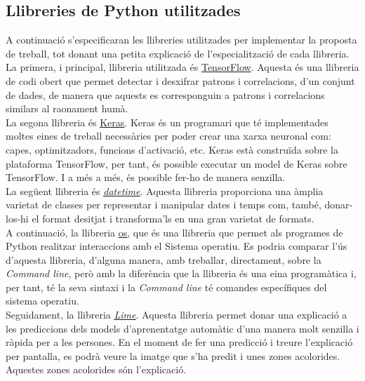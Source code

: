 \documentclass[a4paper,12pt]{report}
\begin{document}
\subsection*{Llibreries de Python utilitzades}
A continuació s'especificaran les llibreries utilitzades per implementar la proposta de treball, tot donant una petita explicació de l'especialització de cada llibreria.\\
La primera, i principal, llibreria utilitzada és \href{https://www.tensorflow.org/?hl=es-419}{\underline{TensorFlow}}. Aquesta és una llibreria de codi obert que permet detectar i desxifrar patrons i correlacions, d'un conjunt de dades, de manera que aquests es corresponguin a patrons i correlacions similars al raonament humà.\\
La segona llibreria és \href{https://keras.io}{\underline{Keras}}. Keras és un programari que té implementades moltes eines de treball necessàries per poder crear una xarxa neuronal com: capes, optimitzadors, funcions d'activació, etc. Keras està construïda sobre la plataforma TensorFlow, per tant, és possible executar un model de Keras sobre TensorFlow. I a més a més, és possible fer-ho de manera senzilla.\\
La següent llibreria és \href{https://docs.python.org/3/library/datetime.html}{\underline{\textit{datetime}}}. Aquesta llibreria proporciona una àmplia varietat de classes per representar i manipular dates i temps com, també, donar-los-hi el format desitjat i transforma'ls en una gran varietat de formats.\\
A continuació, la llibreria \href{https://docs.python.org/3/library/os.html}{\underline{os}}, que és una llibreria que permet als programes de Python realitzar interaccions amb el Sistema operatiu. Es podria comparar l'ús d'aquesta llibreria, d'alguna manera, amb treballar, directament, sobre la \textit{Command line}, però amb la diferència que la llibreria és una eina programàtica i, per tant, té la seva sintaxi i la \textit{Command line} té comandes específiques del sistema operatiu.\\
Seguidament, la llibreria \href{https://lime-ml.readthedocs.io/en/latest/}{\underline{\textit{Lime}}}. Aquesta llibreria permet donar una explicació a les prediccions dels models d'aprenentatge automàtic d'una manera molt senzilla i ràpida per a les persones. En el moment de fer una predicció i treure l'explicació per pantalla, es podrà veure la imatge que s'ha predit i unes zones acolorides. Aquestes zones acolorides són l'explicació.\\
\end{document}
